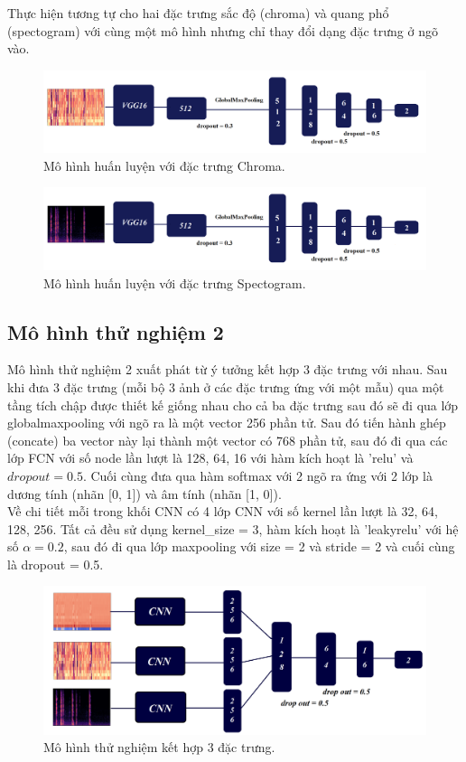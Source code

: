 \documentclass[a4paper, 12pt]{article}
\begin{document}
\noindent
Thực hiện tương tự cho hai đặc trưng sắc độ (chroma) và quang phổ (spectogram) với cùng một mô hình nhưng chỉ thay đổi dạng đặc trưng ở ngõ vào.
\begin{figure}[!h]
\captionsetup{width=0.8\textwidth}
\centering
\includegraphics[width=15.5cm]{images/model 2.png}
\caption{Mô hình huấn luyện với đặc trưng Chroma.}
\end{figure}
\begin{figure}[!h]
\captionsetup{width=0.8\textwidth}
\centering
\includegraphics[width=15.5cm]{images/model 3.png}
\caption{Mô hình huấn luyện với đặc trưng Spectogram.}
\end{figure}


\subsection{Mô hình thử nghiệm 2}
Mô hình thử nghiệm 2 xuất phát từ ý tưởng kết hợp 3 đặc trưng với nhau. Sau khi đưa 3 đặc trưng (mỗi bộ 3 ảnh ở các đặc trưng ứng với một mẫu) qua một tầng tích chập được thiết kế giống nhau cho cả ba đặc trưng sau đó sẽ đi qua lớp globalmaxpooling với ngõ ra là một vector 256 phần tử. Sau đó tiến hành ghép (concate) ba vector này lại thành một vector có 768 phần tử, sau đó đi qua các lớp FCN với số node lần lượt là 128, 64, 16 với hàm kích hoạt là 'relu' và $dropout=0.5$. Cuối cùng đưa qua hàm softmax với 2 ngõ ra ứng với 2 lớp là dương tính (nhãn [0, 1]) và âm tính (nhãn [1, 0]).\\
\noindent
Về chi tiết mỗi trong khối CNN có 4 lớp CNN với số kernel lần lượt là 32, 64, 128, 256. Tất cả đều sử dụng kernel\_size = 3, hàm kích hoạt là 'leakyrelu' với hệ số $\alpha=0.2$, sau đó đi qua lớp maxpooling với size = 2 và stride = 2 và cuối cùng là dropout = 0.5. \\
\begin{figure}[!h]
\captionsetup{width=0.8\textwidth}
\centering
\includegraphics[width=17cm]{images/model 4.png}
\caption{Mô hình thử nghiệm kết hợp 3 đặc trưng.}
\end{figure}
\end{document}
